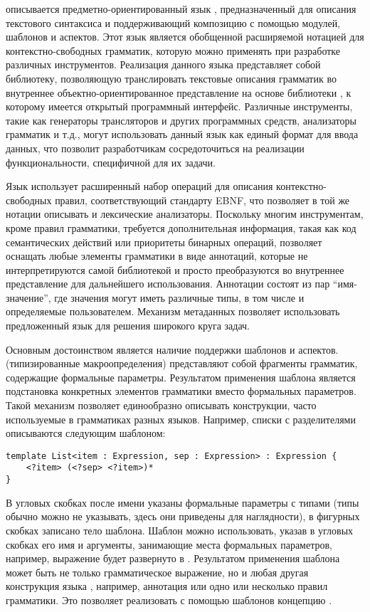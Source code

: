  описывается предметно-ориентированный язык \GRM{}, предназначенный для описания текстового синтаксиса и поддерживающий композицию с помощью модулей, шаблонов и аспектов. 
Этот язык является обобщенной
расширяемой нотацией для контекстно-свободных грамматик, которую можно применять при разработке различных инструментов. Реализация данного языка представляет собой библиотеку, позволяющую транслировать текстовые описания грамматик во внутреннее объектно-ориентированное представление на основе библиотеки , к которому имеется открытый программный интерфейс. 
Различные инструменты, такие как генераторы трансляторов и других программных средств, анализаторы грамматик и т.д., могут использовать данный язык как единый формат для ввода данных, что позволит разработчикам сосредоточиться на реализации функциональности, специфичной для их задачи. 

Язык \GRM{} использует расширенный набор операций для описания контекстно-свободных правил, соответствующий стандарту EBNF, что позволяет в той же нотации описывать и лексические анализаторы. Поскольку многим инструментам, кроме правил грамматики, требуется дополнительная информация, такая как код семантических действий или приоритеты бинарных операций, \GRM{} позволяет оснащать любые элементы грамматики  в виде аннотаций, которые не интерпретируются самой библиотекой и просто преобразуются во внутреннее представление для дальнейшего использования. Аннотации состоят из пар ``имя-значение'', где значения могут иметь различные типы, в том числе и определяемые пользователем. Механизм метаданных позволяет использовать предложенный язык для решения широкого круга задач.

Основным достоинством \GRM{} является наличие поддержки шаблонов и аспектов.
 (типизированные макроопределения) представляют собой фрагменты грамматик, содержащие формальные параметры. Результатом применения шаблона является подстановка конкретных элементов грамматики вместо формальных параметров. Такой механизм позволяет единообразно описывать конструкции, часто используемые в грамматиках разных языков. Например, списки с разделителями описываются следующим шаблоном:
\begin{lstlisting}[xleftmargin=.5cm]
template List<item : Expression, sep : Expression> : Expression {
	<?item> (<?sep> <?item>)*
}
\end{lstlisting}
В угловых скобках после имени  указаны формальные параметры с типами (типы обычно можно не указывать, здесь они приведены для наглядности), в фигурных скобках записано тело шаблона. 
Шаблон можно использовать, указав в угловых скобках его имя и аргументы, занимающие места формальных параметров, например, выражение  будет развернуто в . Результатом применения шаблона может быть не только грамматическое выражение, но и любая другая конструкция языка \GRM{}, например, аннотация или одно или несколько правил грамматики. Это позволяет реализовать с помощью шаблонов концепцию . 

